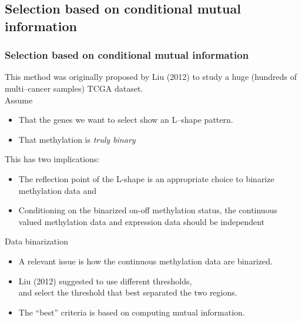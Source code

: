 \documentclass[handout]{beamer}
\begin{document}
\subsection{Selection based on conditional mutual information}

\begin{frame}%
\frametitle{Selection based on conditional mutual information}
This method was originally proposed by Liu (2012) to study a huge (hundreds of multi--cancer samples) TCGA dataset.\\
Assume
 \begin{itemize}
  \item That the genes we want to select show an L--shape pattern.
\item That methylation is \emph{truly binary}
\end{itemize}
This has two implications:
\begin{itemize}
\item The reflection point of the L-shape is an appropriate choice to
  binarize methylation data %
and
\item Conditioning on the binarized on-off methylation status, the
  continuous valued methylation data and expression data should be
  independent%
\end{itemize}
\end{frame}

\begin{frame}{Data binarization}
\begin{itemize}
\item A relevant issue is how the continuous methylation data are binarized.
\item Liu (2012) suggested to use different thresholds,\\
 and select the threshold that best separated the two regions.
\item The ``best'' criteria is based on computing mutual information.
\end{itemize}

\end{frame}
\end{document}

